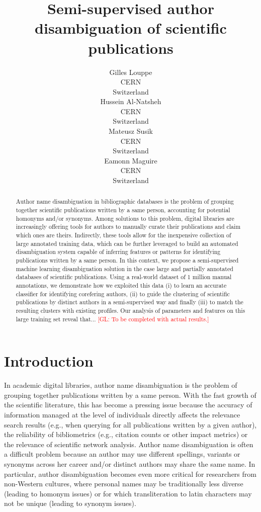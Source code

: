 \documentclass{article}
\title{Semi-supervised author disambiguation of scientific publications}
\author{Gilles Louppe\\
        CERN\\
        Switzerland\\
\And Hussein Al-Natsheh\\
        CERN\\
        Switzerland\\
\And Mateusz Susik\\
        CERN\\
        Switzerland\\
\And Eamonn Maguire\\
        CERN\\
        Switzerland}
\date{}
\newcommand{\glnote}[1]{\textcolor{red}{[GL: #1]}}
\begin{document}
\maketitle

\begin{abstract}

Author name disambiguation in bibliographic databases is the problem of
grouping together scientific publications written by a same person, accounting
for potential homonyms and/or synonyms. Among solutions to this problem, digital
libraries are increasingly offering tools for authors to manually curate their
publications and claim which ones are theirs. Indirectly, these tools allow for
the inexpensive collection of large annotated training data, which can be
further leveraged to build an automated disambiguation system capable of
inferring features or patterns for identifying publications written by a same
person.  In this context, we propose a semi-supervised machine learning
disambiguation solution in the case large and partially annotated databases of
scientific publications. Using a real-world dataset of 1 million manual
annotations, we demonstrate how we exploited this data (i) to learn an accurate
classifier for identifying corefering authors, (ii) to guide the clustering of
scientific publications by distinct authors in a semi-supervised way and
finally (iii) to match the resulting clusters with existing profiles.  Our
analysis of parameters and features on this large training set reveal that...
\glnote{To be completed with actual results.}

\end{abstract}



\section{Introduction}
\label{introduction}


In academic digital libraries, author name disambiguation is the problem of
grouping together publications written by a same person.  With the fast growth
of the scientific literature, this has become a pressing issue because the
accuracy of information managed at the level of individuals directly affects
the relevance search results (e.g., when querying for all publications written
by a given author), the reliability of bibliometrics (e.g., citation counts or
other impact metrics) or the relevance of scientific network analysis. Author
name disambiguation is often a difficult problem because an author may use
different spellings, variants or synonyms across her career and/or distinct
authors may share the same name. In particular, author disambiguation becomes
even more critical for researchers from non-Western cultures, where personal names
may be traditionally less diverse (leading to homonym issues) or for which
transliteration to latin characters may not be unique (leading to synonym
issues).
\end{document}
